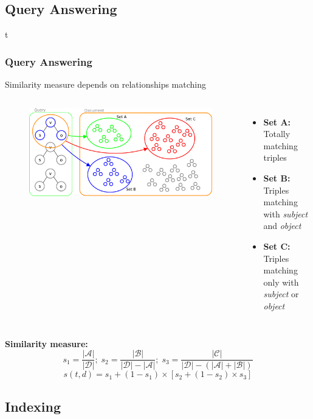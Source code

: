 \documentclass{beamer}
\begin{document}
\subsection{Query Answering}

\begin{frame}{t}
\frametitle{Query Answering}
Similarity measure depends on relationships matching
\bigskip
\begin{columns}[T]
\begin{figure}
\includegraphics[scale=0.2]{imgs/sets}
\end{figure}
\begin{itemize}
\item {\bfseries{Set A:\\}} Totally matching triples
\item {\bfseries{Set B:\\}} Triples matching with \emph{subject} and \emph{object}
\item {\bfseries{Set C:\\}} Triples matching only with \emph{subject} or \emph{object}
\end{itemize}
\end{columns}
\bigskip
\vspace{1mm}
{\color{red}\bfseries{Similarity measure:}}
\tiny
$$
s_{1} = \frac{|\mathcal{A}|}{|\mathcal{D}|};\;
s_{2} = \frac{|\mathcal{B}|}{|\mathcal{D}| - |\mathcal{A}|};\;
s_{3} = \frac{|\mathcal{C}|}{|\mathcal{D}|-(|\mathcal{A}|+|\mathcal{B}|)}
$$
\small
$$
s (t, d) = s_{1} + (1 - s_{1}) \times
[s_{2} + (1 - s_{2}) \times s_{3}]
$$
\bigskip
\end{frame}

\subsection{Indexing}
\end{document}
